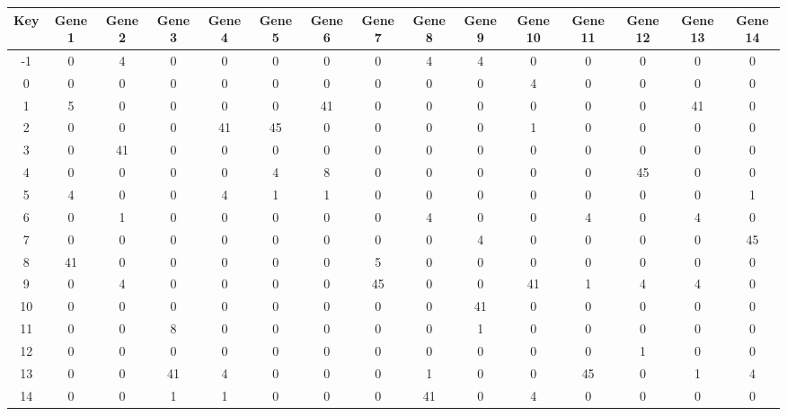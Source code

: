 \begin{tabular}{|c|c|c|c|c|c|c|c|c|c|c|c|c|c|c|}
\hline
Key & Gene 1 & Gene 2 & Gene 3 & Gene 4 & Gene 5 & Gene 6 & Gene 7 & Gene 8 & Gene 9 & Gene 10 & Gene 11 & Gene 12 & Gene 13 & Gene 14 \\
\hline
-1 & 0 & 4 & 0 & 0 & 0 & 0 & 0 & 4 & 4 & 0 & 0 & 0 & 0 & 0 \\
0 & 0 & 0 & 0 & 0 & 0 & 0 & 0 & 0 & 0 & 4 & 0 & 0 & 0 & 0 \\
1 & 5 & 0 & 0 & 0 & 0 & 41 & 0 & 0 & 0 & 0 & 0 & 0 & 41 & 0 \\
2 & 0 & 0 & 0 & 41 & 45 & 0 & 0 & 0 & 0 & 1 & 0 & 0 & 0 & 0 \\
3 & 0 & 41 & 0 & 0 & 0 & 0 & 0 & 0 & 0 & 0 & 0 & 0 & 0 & 0 \\
4 & 0 & 0 & 0 & 0 & 4 & 8 & 0 & 0 & 0 & 0 & 0 & 45 & 0 & 0 \\
5 & 4 & 0 & 0 & 4 & 1 & 1 & 0 & 0 & 0 & 0 & 0 & 0 & 0 & 1 \\
6 & 0 & 1 & 0 & 0 & 0 & 0 & 0 & 4 & 0 & 0 & 4 & 0 & 4 & 0 \\
7 & 0 & 0 & 0 & 0 & 0 & 0 & 0 & 0 & 4 & 0 & 0 & 0 & 0 & 45 \\
8 & 41 & 0 & 0 & 0 & 0 & 0 & 5 & 0 & 0 & 0 & 0 & 0 & 0 & 0 \\
9 & 0 & 4 & 0 & 0 & 0 & 0 & 45 & 0 & 0 & 41 & 1 & 4 & 4 & 0 \\
10 & 0 & 0 & 0 & 0 & 0 & 0 & 0 & 0 & 41 & 0 & 0 & 0 & 0 & 0 \\
11 & 0 & 0 & 8 & 0 & 0 & 0 & 0 & 0 & 1 & 0 & 0 & 0 & 0 & 0 \\
12 & 0 & 0 & 0 & 0 & 0 & 0 & 0 & 0 & 0 & 0 & 0 & 1 & 0 & 0 \\
13 & 0 & 0 & 41 & 4 & 0 & 0 & 0 & 1 & 0 & 0 & 45 & 0 & 1 & 4 \\
14 & 0 & 0 & 1 & 1 & 0 & 0 & 0 & 41 & 0 & 4 & 0 & 0 & 0 & 0 \\
\hline
\end{tabular}